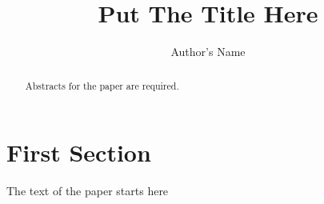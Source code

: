 \documentclass[11pt,hyp,]{nyjm}
\title{Put The Title Here}
\author{Author's Name}
\begin{document}
 
 
\begin{abstract}  
      Abstracts for the paper are required.
\end{abstract} 
\maketitle
\tableofcontents


 
\section{First Section}
The text of the paper starts here
\end{document}
